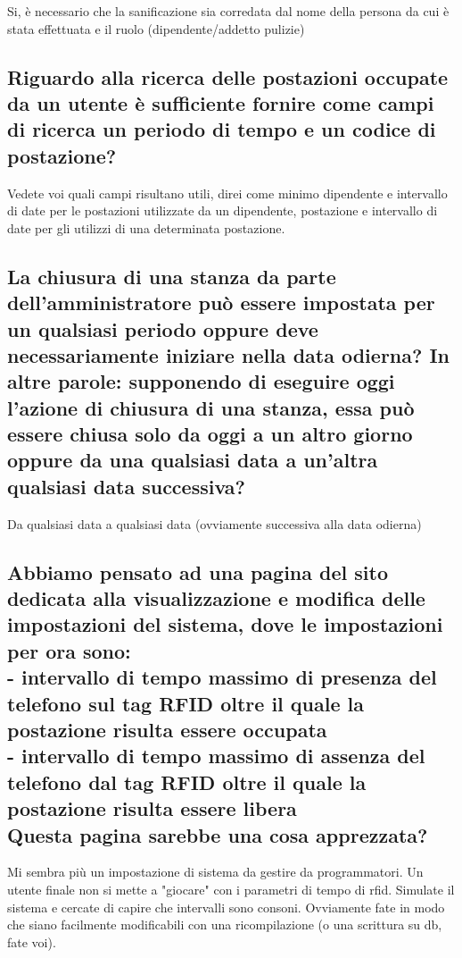 Si, è necessario che la sanificazione sia corredata dal nome della persona da cui è stata effettuata e il ruolo (dipendente/addetto pulizie)

\subsection{Riguardo alla ricerca delle postazioni occupate da un utente è sufficiente fornire come campi di ricerca un periodo di tempo e un codice di postazione?}

Vedete voi quali campi risultano utili, direi come minimo dipendente e intervallo di date per le postazioni utilizzate da un dipendente, postazione e intervallo di date per gli utilizzi di una determinata postazione.

\subsection{La chiusura di una stanza da parte dell'amministratore può essere impostata per un qualsiasi periodo oppure deve necessariamente iniziare nella data odierna? In altre parole: supponendo di eseguire oggi l'azione di chiusura di una stanza, essa può essere chiusa solo da oggi a un altro giorno oppure da una qualsiasi data a un'altra qualsiasi data successiva?}

Da qualsiasi data a qualsiasi data (ovviamente successiva alla data odierna)

\subsection{Abbiamo pensato ad una pagina del sito dedicata alla visualizzazione e modifica delle impostazioni del sistema, dove le impostazioni per ora sono: \\
	- intervallo di tempo massimo di presenza del telefono sul tag RFID oltre il quale la postazione risulta essere occupata \\
	- intervallo di tempo massimo di assenza del telefono dal tag RFID oltre il quale la postazione risulta essere libera \\
	Questa pagina sarebbe una cosa apprezzata?}

Mi sembra più un impostazione di sistema da gestire da programmatori. Un utente finale non si mette a "giocare" con i parametri di tempo di rfid. Simulate il sistema e cercate di capire che intervalli sono consoni. Ovviamente fate in modo che siano facilmente modificabili con una ricompilazione (o una scrittura su db, fate voi).


